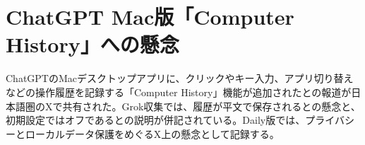\section{ChatGPT Mac版「Computer History」への懸念}
ChatGPTのMacデスクトップアプリに、クリックやキー入力、アプリ切り替えなどの操作履歴を記録する「Computer History」機能が追加されたとの報道が日本語圏のXで共有された。Grok収集では、履歴が平文で保存されるとの懸念と、初期設定ではオフであるとの説明が併記されている。Daily版では、プライバシーとローカルデータ保護をめぐるX上の懸念として記録する。
